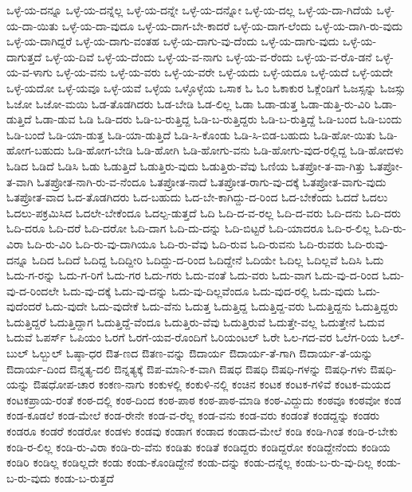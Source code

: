 {ಒಳ್ಳೆ-ಯ-ದನ್ನೂ
ಒಳ್ಳೆ-ಯ-ದನ್ನೆಲ್ಲ
ಒಳ್ಳೆ-ಯ-ದನ್ನೇ
ಒಳ್ಳೆ-ಯ-ದನ್ನೋ
ಒಳ್ಳೆ-ಯ-ದಲ್ಲ
ಒಳ್ಳೆ-ಯ-ದಾ-ಗಿದೆಯೆ
ಒಳ್ಳೆ-ಯ-ದಾ-ಯಿತು
ಒಳ್ಳೆ-ಯ-ದಾ-ವುದೂ
ಒಳ್ಳೆ-ಯ-ದಾಗ-ಬೇ-ಕಾದರೆ
ಒಳ್ಳೆ-ಯ-ದಾಗ-ಲೆಂದು
ಒಳ್ಳೆ-ಯ-ದಾಗಿ-ರು-ವುದು
ಒಳ್ಳೆ-ಯ-ದಾಗಿದ್ದರೆ
ಒಳ್ಳೆ-ಯ-ದಾಗು-ವಂತಹ
ಒಳ್ಳೆ-ಯ-ದಾಗು-ವು-ದೆಂದು
ಒಳ್ಳೆ-ಯ-ದಾಗು-ವುದು
ಒಳ್ಳೆ-ಯ-ದಾಗುತ್ತದೆ
ಒಳ್ಳೆ-ಯ-ದಿವೆ
ಒಳ್ಳೆ-ಯ-ದೆಂದು
ಒಳ್ಳೆ-ಯ-ವ-ನಾಗು
ಒಳ್ಳೆ-ಯ-ವ-ರೆಂದು
ಒಳ್ಳೆ-ಯ-ವ-ರೊ-ಡನೆ
ಒಳ್ಳೆ-ಯ-ವ-ಳಾಗು
ಒಳ್ಳೆ-ಯ-ವನು
ಒಳ್ಳೆ-ಯ-ವರು
ಒಳ್ಳೆ-ಯ-ವರೇ
ಒಳ್ಳೆ-ಯದು
ಒಳ್ಳೆ-ಯದೂ
ಒಳ್ಳೆ-ಯದೆ
ಒಳ್ಳೆ-ಯದೇ
ಒಳ್ಳೆ-ಯದೋ
ಒಳ್ಳೆ-ಯವೂ
ಒಳ್ಳೆ-ಯವೆ
ಒಳ್ಳೆಯ
ಒಳ್ಳೊಳ್ಳೆಯ
ಒಸಾಕ
ಓ
ಓಂ
ಓಕಾಕುರ
ಓಕ್ಲೆಂಡಿಗೆ
ಓಜಸ್ಸನ್ನು
ಓಜಸ್ಸು
ಓಜೋ
ಓಜೋ-ಮಯಿ
ಓಡ-ತೊಡಗಿದರು
ಓಡ-ಬೇಡಿ
ಓಡ-ಲಿಲ್ಲ
ಓಡಾ
ಓಡಾ-ಡುತ್ತ
ಓಡಾ-ಡುತ್ತಿ-ರು-ವಿರಿ
ಓಡಾ-ಡುತ್ತಿದೆ
ಓಡಾ-ಡುವ
ಓಡಿ
ಓಡಿ-ದರು
ಓಡಿ-ಬ-ರುತ್ತಿದ್ದ
ಓಡಿ-ಬ-ರುತ್ತಿದ್ದರು
ಓಡಿ-ಬ-ರುತ್ತಿದ್ದೆ
ಓಡಿ-ಬಂದ
ಓಡಿ-ಬಂದು
ಓಡಿ-ಬಂದೆ
ಓಡಿ-ಯಾ-ಡುತ್ತ
ಓಡಿ-ಯಾ-ಡುತ್ತಿದೆ
ಓಡಿ-ಸಿ-ಕೊಂಡು
ಓಡಿ-ಸಿ-ಬಿಡ-ಬಹುದು
ಓಡಿ-ಹೋ-ಯಿತು
ಓಡಿ-ಹೋಗ-ಬಹುದು
ಓಡಿ-ಹೋಗ-ಬೇಡಿ
ಓಡಿ-ಹೋಗಿ
ಓಡಿ-ಹೋಗು-ವನು
ಓಡಿ-ಹೋಗು-ವುದ-ರಲ್ಲಿದ್ದ
ಓಡಿ-ಹೋದಳು
ಓಡಿದ
ಓಡಿದೆ
ಓಡಿಸಿ
ಓಡು
ಓಡುತ್ತಿದೆ
ಓಡುತ್ತಿರು-ವುದು
ಓಡುತ್ತಿರು-ವೆವು
ಓಣಿಯ
ಓತಪ್ರೋ-ತ-ವಾ-ಗಿತ್ತು
ಓತಪ್ರೋ-ತ-ವಾಗಿ
ಓತಪ್ರೋತ-ನಾಗಿ-ರು-ವ-ನೆಂದೂ
ಓತಪ್ರೋತ-ನಾದೆ
ಓತಪ್ರೋತ-ರಾಗು-ವು-ದಕ್ಕೆ
ಓತಪ್ರೋತ-ವಾಗು-ವುದು
ಓತಪ್ರೋತ-ವಾದ
ಓದ-ತೊಡಗಿದರು
ಓದ-ಬಹುದು
ಓದ-ಬೇ-ಕಾಗಿದ್ದು-ದ-ರಿಂದ
ಓದ-ಬೇಕೆಂದು
ಓದದೆ
ಓದಲು
ಓದಲು-ಪಕ್ರಮಿಸಿದ
ಓದಲೇ-ಬೇಕೆಂದೂ
ಓದಲ್ಪ-ಡುತ್ತದೆ
ಓದಿ
ಓದಿ-ದ-ವ-ರಲ್ಲ
ಓದಿ-ದ-ವರು
ಓದಿ-ದನು
ಓದಿ-ದರು
ಓದಿ-ದರೂ
ಓದಿ-ದರೆ
ಓದಿ-ದರೋ
ಓದಿ-ದಾಗ
ಓದಿ-ದು-ದನ್ನು
ಓದಿ-ಬಿಟ್ಟರೆ
ಓದಿ-ಯಾದರೂ
ಓದಿ-ರ-ಲಿಲ್ಲ
ಓದಿ-ರು-ವಿರಾ
ಓದಿ-ರು-ವಿರಿ
ಓದಿ-ರು-ವು-ದಾಗಿಯೂ
ಓದಿ-ರು-ವೆವು
ಓದಿ-ರುವ
ಓದಿ-ರುವನು
ಓದಿ-ರುವರು
ಓದಿ-ರುವು-ದನ್ನೂ
ಓದಿದ
ಓದಿದೆ
ಓದಿದ್ದ
ಓದಿದ್ದೀರಿ
ಓದಿದ್ದು-ದ-ರಿಂದ
ಓದಿದ್ದೇನೆ
ಓದಿಯೇ
ಓದಿಲ್ಲ
ಓದಿಲ್ಲವೆ
ಓದಿಸಿ
ಓದು
ಓದು-ಗ-ರನ್ನು
ಓದು-ಗ-ರಿಗೆ
ಓದು-ಗರ
ಓದು-ಗರು
ಓದು-ವಂತೆ
ಓದು-ವರು
ಓದು-ವಾಗ
ಓದು-ವು-ದ-ರಿಂದ
ಓದು-ವು-ದ-ರಿಂದಲೇ
ಓದು-ವು-ದಕ್ಕೆ
ಓದು-ವು-ದನ್ನು
ಓದು-ವು-ದಿಲ್ಲವೆಂದೂ
ಓದು-ವುದ-ರಲ್ಲಿ
ಓದು-ವುದು
ಓದು-ವುದೆಂದರೆ
ಓದು-ವುದೇ
ಓದು-ವುದೇಕೆ
ಓದು-ವೆನು
ಓದುತ್ತ
ಓದುತ್ತಿದ್ದ
ಓದುತ್ತಿದ್ದ-ವರು
ಓದುತ್ತಿದ್ದನು
ಓದುತ್ತಿದ್ದರು
ಓದುತ್ತಿದ್ದರೆ
ಓದುತ್ತಿದ್ದಾಗ
ಓದುತ್ತಿದ್ದೆ-ವೆಂದೂ
ಓದುತ್ತಿರು-ವೆವು
ಓದುತ್ತಿರುವೆ
ಓದುತ್ತೇ-ವಲ್ಲ
ಓದುತ್ತೇನೆ
ಓದುವ
ಓದುವೆ
ಓಪರ್ಸ್
ಓಪಿಯಂ
ಓರಗೆ
ಓರಗೆ-ಯವ-ರೊಂದಿಗೆ
ಓರಿಯಂಟಲ್
ಓರೇ
ಓಲ-ಗದ-ವರ
ಓಲೆಗ-ರಿಯ
ಓಲ್-ಬುಲ್
ಓಲ್ಬುಲ್
ಓಷ್ಠಾ-ಧರ
ಔತ-ಣದ
ಔತಣ-ವನ್ನು
ಔದಾರ್ಯ
ಔದಾರ್ಯ-ತೆ-ಗಾಗಿ
ಔದಾರ್ಯ-ತೆ-ಯನ್ನು
ಔದಾರ್ಯ-ದಿಂದ
ಔನ್ನತ್ಯ-ದಲಿ
ಔನ್ನತ್ಯಕ್ಕೆ
ಔಪ-ಮಾನಿ-ಕ-ವಾಗಿ
ಔಷಧ
ಔಷಧಿ
ಔಷಧಿ-ಗಳನ್ನು
ಔಷಧಿ-ಗಳು
ಔಷಧಿ-ಯನ್ನು
ಔಷಧೋಪ-ಚಾರ
ಕಂಕಣ-ನಾಗು
ಕಂಕುಳಲ್ಲಿ
ಕಂಕುಳಿ-ನಲ್ಲಿ
ಕಂಚಿನ
ಕಂಟಕ
ಕಂಟಕ-ಗಳಿವೆ
ಕಂಟಕ-ಮಯದ
ಕಂಟಕಪ್ರಾಯ-ರಂತೆ
ಕಂಠ-ದಲ್ಲಿ
ಕಂಠ-ದಿಂದ
ಕಂಠ-ಪಾಠ
ಕಂಠ-ಪಾಠ-ಮಾಡಿ
ಕಂಠ-ವಿದ್ದುದು
ಕಂಠವೂ
ಕಂಠವೋ
ಕಂಡ
ಕಂಡ-ಕೂಡಲೆ
ಕಂಡ-ಮೇಲೆ
ಕಂಡ-ರೇನೇ
ಕಂಡ-ವ-ರೆಲ್ಲ
ಕಂಡ-ವನು
ಕಂಡ-ವರು
ಕಂಡಂತೆ
ಕಂಡದ್ದನ್ನು
ಕಂಡರು
ಕಂಡರೂ
ಕಂಡರೆ
ಕಂಡರೋ
ಕಂಡಳು
ಕಂಡವು
ಕಂಡಾಗ
ಕಂಡಾದ
ಕಂಡಾದ-ಮೇಲೆ
ಕಂಡಿ
ಕಂಡಿ-ಗಿಂತ
ಕಂಡಿ-ರ-ಬೇಕು
ಕಂಡಿ-ರ-ಲಿಲ್ಲ
ಕಂಡಿ-ರು-ವಿರಾ
ಕಂಡಿ-ರು-ವೆನು
ಕಂಡಿತು
ಕಂಡಿತೆ
ಕಂಡಿದ್ದರು
ಕಂಡಿದ್ದರೋ
ಕಂಡಿದ್ದೇನೆಂದು
ಕಂಡಿಯ
ಕಂಡಿರಿ
ಕಂಡಿಲ್ಲ
ಕಂಡಿಲ್ಲದೇ
ಕಂಡು
ಕಂಡು-ಕೊಂಡಿದ್ದೇನೆ
ಕಂಡು-ದನ್ನು
ಕಂಡು-ದನ್ನೆಲ್ಲ
ಕಂಡು-ಬ-ರು-ವು-ದಿಲ್ಲ
ಕಂಡು-ಬ-ರು-ವುದು
ಕಂಡು-ಬ-ರುತ್ತದೆ
}
